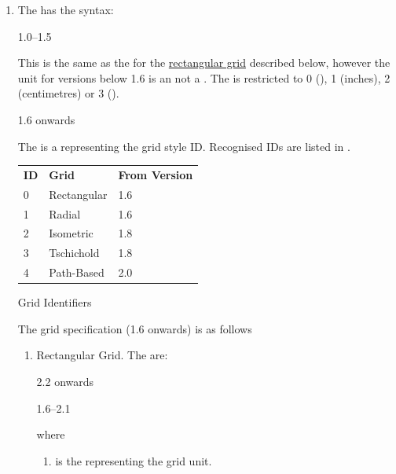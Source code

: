\begin{numbered}
\begin{enumerate}
  \item The  has the syntax:
  \begin{jdrversion}{1.0--1.5}
  \begin{syntaxline}
    
  \end{syntaxline}
  This is the same as the 
  for the \hyperref[jdr:rectgrid]{rectangular grid} described below, 
  however the  unit for versions below 1.6 is an  not a
  . The  is restricted to
  0 (), 1 (inches),
  2 (centimetres) or 3 ().
  \end{jdrversion}
  \begin{jdrversion}{1.6 onwards}
  \begin{syntaxline}
   
  \end{syntaxline}
  The  is a  representing the grid style ID.
  Recognised IDs are listed in .
  \end{jdrversion}

{%
 \begin{tabular}{lll}
  \bfseries ID & \bfseries Grid & \bfseries From Version\\
  0 & Rectangular & 1.6\\
  1 & Radial & 1.6 \\
  2 & Isometric & 1.8\\
  3 & Tschichold & 1.8\\
  4 & Path-Based & 2.0
 \end{tabular}
}
{Grid Identifiers}

  The grid specification (1.6 onwards) is as follows

    \begin{enumerate}
    \item\label{jdr:rectgrid} Rectangular Grid. The  are:
    \begin{jdrversion}{2.2 onwards}
    \begin{syntaxline}
        
    \end{syntaxline}
    \end{jdrversion}
    \begin{jdrversion}{1.6--2.1}
    \begin{syntaxline}
      
    \end{syntaxline}
    \end{jdrversion}
    where
     \begin{enumerate}
     \item {} is the  representing the grid unit.


\end{enumerate}
\end{enumerate}
\end{enumerate}
\end{numbered}
